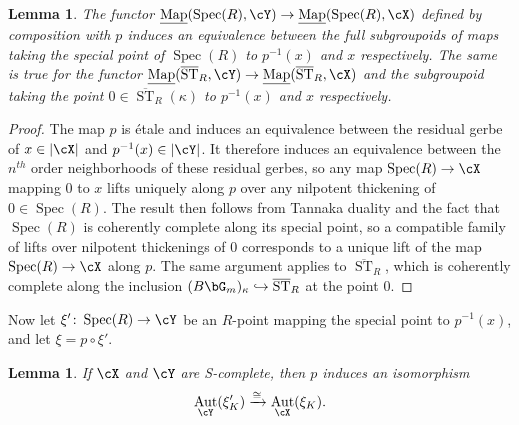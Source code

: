 \documentclass[a4paper]{amsart}
\numberwithin{equation}{section}
\theoremstyle{plain}
\newtheorem{lem}[thm]{Lemma}
\theoremstyle{definition}
\DeclareMathOperator{\Spec}{Spec}
\DeclareMathOperator{\ST}{ST}
\DeclareMathOperator{\Aut}{Aut}
\newcommand{\uMap}{\underline{{\rm Map}}}
\newcommand{\co}{\colon}
\def\oST{\overline{\ST}}
\begin{document}
\begin{lem}
The functor $\uMap(\Spec(R),\cY) \to \uMap(\Spec(R),\cX)$ defined by composition with $p$ induces an equivalence between the full subgroupoids of maps taking the special point of $\Spec(R)$ to $p^{-1}(x)$ and $x$ respectively. The same is true for the functor $\uMap(\oST_R,\cY) \to \uMap(\oST_R,\cX)$ and the subgroupoid taking the point $0 \in \oST_R(\kappa)$ to $p^{-1}(x)$ and $x$ respectively.
\end{lem}

\begin{proof}
The map $p$ is \'etale and induces an equivalence between the residual gerbe of $x \in |\cX|$ and $p^{-1}(x) \in |\cY|$. It therefore induces an equivalence between the $n^{th}$ order neighborhoods of these residual gerbes, so any map $\Spec(R) \to \cX$ mapping $0$ to $x$ lifts uniquely along $p$ over any nilpotent thickening of $0 \in \Spec(R)$. The result then follows from Tannaka duality and the fact that $\Spec(R)$ is coherently complete along its special point, so a compatible family of lifts over nilpotent thickenings of $0$ corresponds to a unique lift of the map $\Spec(R) \to \cX$ along $p$. The same argument applies to $\oST_R$, which is coherently complete along the inclusion $(B\bG_m)_\kappa \hookrightarrow \oST_R$ at the point $0$.
\end{proof}

Now let $\xi' \co \Spec(R) \to \cY$ be an $R$-point mapping the special point to $p^{-1}(x)$, and let $\xi = p \circ \xi'$.

\begin{lem} \label{L:stabilizer_preserving}
If $\cX$ and $\cY$ are {\textsf{S}}-complete, then $p$ induces an isomorphism
\[
\Aut_\cY(\xi'_K) \xrightarrow{\cong} \Aut_{\cX}(\xi_K).
\]
\end{lem}
\end{document}
